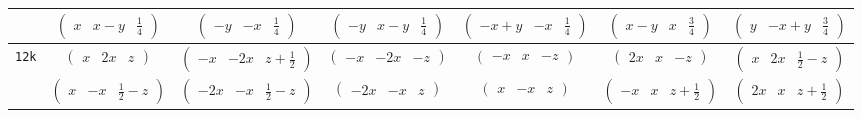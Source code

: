 \documentclass[fleqn,9pt,landscape]{jsarticle}
\begin{document}
\begin{center}
\begin{longtable}{ccccccc}
& $ \begin{pmatrix} x & x - y & \frac{1}{4} \end{pmatrix} $ & $ \begin{pmatrix} - y & - x & \frac{1}{4} \end{pmatrix} $ & $ \begin{pmatrix} - y & x - y & \frac{1}{4} \end{pmatrix} $ & $ \begin{pmatrix} - x + y & - x & \frac{1}{4} \end{pmatrix} $ & $ \begin{pmatrix} x - y & x & \frac{3}{4} \end{pmatrix} $ & $ \begin{pmatrix} y & - x + y & \frac{3}{4} \end{pmatrix} $ \\ \hline
{\tt 12k} & $ \begin{pmatrix} x & 2 x & z \end{pmatrix} $ & $ \begin{pmatrix} - x & - 2 x & z + \frac{1}{2} \end{pmatrix} $ & $ \begin{pmatrix} - x & - 2 x & - z \end{pmatrix} $ & $ \begin{pmatrix} - x & x & - z \end{pmatrix} $ & $ \begin{pmatrix} 2 x & x & - z \end{pmatrix} $ & $ \begin{pmatrix} x & 2 x & \frac{1}{2} - z \end{pmatrix} $ \\
& $ \begin{pmatrix} x & - x & \frac{1}{2} - z \end{pmatrix} $ & $ \begin{pmatrix} - 2 x & - x & \frac{1}{2} - z \end{pmatrix} $ & $ \begin{pmatrix} - 2 x & - x & z \end{pmatrix} $ & $ \begin{pmatrix} x & - x & z \end{pmatrix} $ & $ \begin{pmatrix} - x & x & z + \frac{1}{2} \end{pmatrix} $ & $ \begin{pmatrix} 2 x & x & z + \frac{1}{2} \end{pmatrix} $ \\ \hline

\end{longtable}
\end{center}
\end{document}
